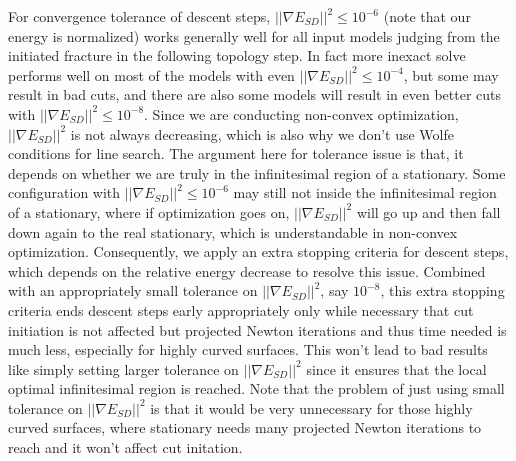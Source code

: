 For convergence tolerance of descent steps, $||\nabla E_{SD}||^2 \leq 10^{-6}$ (note that our energy is normalized) works generally well for all input models judging from the initiated fracture in the following topology step. In fact more inexact solve performs well on most of the models with even $||\nabla E_{SD}||^2 \leq 10^{-4}$, but some may result in bad cuts, and there are also some models will result in even better cuts with $||\nabla E_{SD}||^2 \leq 10^{-8}$. Since we are conducting non-convex optimization, $||\nabla E_{SD}||^2$ is not always decreasing, which is also why we don't use Wolfe conditions for line search. The argument here for tolerance issue is that, it depends on whether we are truly in the infinitesimal region of a stationary. Some configuration with $||\nabla E_{SD}||^2 \leq 10^{-6}$ may still not inside the infinitesimal region of a stationary, where if optimization goes on, $||\nabla E_{SD}||^2$ will go up and then fall down again to the real stationary, which is understandable in non-convex optimization. Consequently, we apply an extra stopping criteria for descent steps, which depends on the relative energy decrease to resolve this issue. Combined with an appropriately small tolerance on $||\nabla E_{SD}||^2$, say $10^{-8}$, this extra stopping criteria ends descent steps early appropriately only while necessary that cut initiation is not affected but projected Newton iterations and thus time needed is much less, especially for highly curved surfaces. This won't lead to bad results like simply setting larger tolerance on $||\nabla E_{SD}||^2$ since it ensures that the local optimal infinitesimal region is reached. Note that the problem of just using small tolerance on $||\nabla E_{SD}||^2$ is that it would be very unnecessary for those highly curved surfaces, where stationary needs many projected Newton iterations to reach and it won't affect cut initation.

